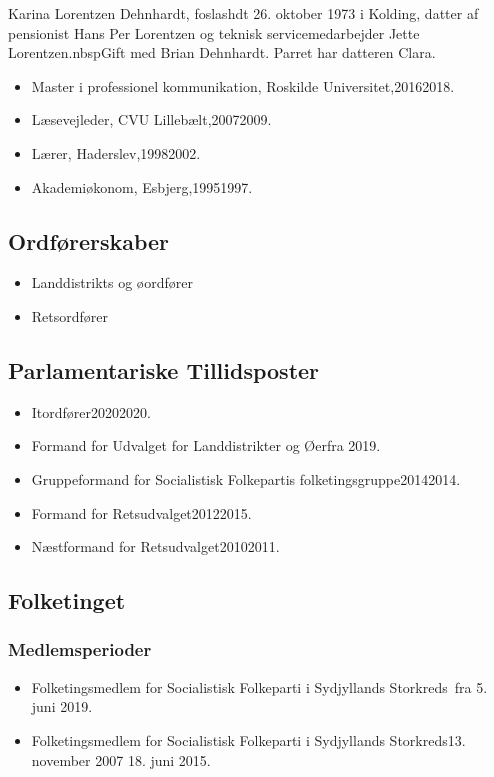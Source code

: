 \documentclass[11pt, a4paper]{awesome-cv}
\begin{document}
\makecvheader[R]
\makelettertitle
\begin{cvletter}
Karina Lorentzen Dehnhardt, foslashdt 26. oktober 1973 i Kolding, datter af pensionist Hans Per Lorentzen og teknisk servicemedarbejder Jette Lorentzen.nbspGift med Brian Dehnhardt. Parret har datteren Clara.

\begin{itemize}
\item Master i professionel kommunikation, Roskilde Universitet,20162018.
\item Læsevejleder, CVU Lillebælt,20072009.
\item Lærer, Haderslev,19982002.
\item Akademiøkonom, Esbjerg,19951997.
\end{itemize}
\subsection*{Ordførerskaber}
\begin{itemize}
\item Landdistrikts og øordfører
\item Retsordfører
\end{itemize}
\subsection*{Parlamentariske Tillidsposter}
\begin{itemize}
\item Itordfører20202020.
\item Formand for Udvalget for Landdistrikter og Øerfra 2019.
\item Gruppeformand for Socialistisk Folkepartis folketingsgruppe20142014.
\item Formand for Retsudvalget20122015.
\item Næstformand for Retsudvalget20102011.
\end{itemize}
\subsection*{Folketinget}
\subsubsection*{Medlemsperioder}
\begin{itemize}
\item Folketingsmedlem for Socialistisk Folkeparti i Sydjyllands Storkreds fra 5. juni 2019.
\item Folketingsmedlem for Socialistisk Folkeparti i Sydjyllands Storkreds13. november 2007  18. juni 2015.
\end{itemize}

\end{cvletter}
\end{document}
